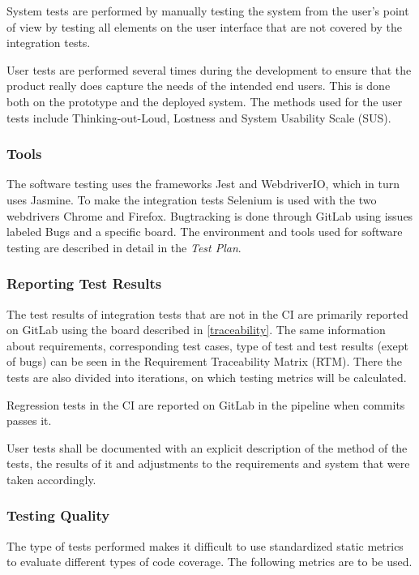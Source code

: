 \documentclass{article}
\begin{document}
	System tests are performed by manually testing the system from the user's point of view by testing all elements on the user interface that are not covered by the integration tests. 
	
	User tests are performed several times during the development to ensure that the product really does capture the needs of the intended end users. This is done both on the prototype and the deployed system. The methods used for the user tests include Thinking-out-Loud, Lostness and System Usability Scale (SUS).
	
	
	\subsubsection{Tools}
	The software testing uses the frameworks Jest and WebdriverIO, which in turn uses Jasmine. To make the integration tests Selenium is used with the two webdrivers Chrome and Firefox. Bugtracking is done through GitLab using issues labeled Bugs and a specific board. The environment and tools used for software testing are described in detail in the \textit{Test Plan}. 
	
	\subsubsection{Reporting Test Results}
	The test results of integration tests that are not in the CI are primarily reported on GitLab using the board described in \ref{traceability}. The same information about requirements, corresponding test cases, type of test and test results (exept of bugs) can be seen in the Requirement Traceability Matrix (RTM). There the tests are also divided into iterations, on which testing metrics will be calculated.
	
	Regression tests in the CI are reported on GitLab in the pipeline when commits passes it. 
	
	
	User tests shall be documented with an explicit description of the method of the tests, the results of it and adjustments to the requirements and system that were taken accordingly.
	
	\subsubsection{Testing Quality}
	The type of tests performed makes it difficult to use standardized static metrics to evaluate different types of code coverage. The following metrics are to be used.
	
\end{document}
